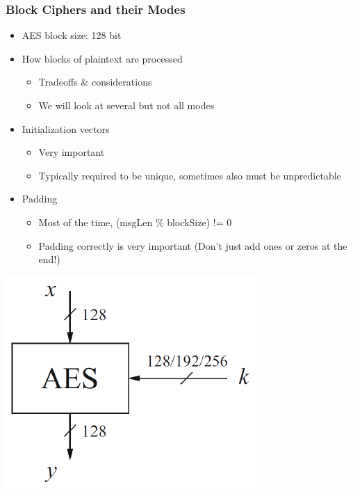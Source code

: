 \subsubsection{Block Ciphers and their Modes}
\begin{minipage}{0.7\linewidth}
  \begin{itemize}
    \item AES block size: 128 bit
    \item How blocks of plaintext are processed
          \begin{itemize}
            \item Tradeoffs \& considerations
            \item We will look at several but not all modes
          \end{itemize}
    \item Initialization vectors
          \begin{itemize}
            \item Very important
            \item Typically required to be unique, sometimes also must be unpredictable
          \end{itemize}
    \item Padding
          \begin{itemize}
            \item Most of the time, (msgLen \% blockSize) != 0
            \item Padding correctly is very important (Don't just add ones or zeros at the end!)
          \end{itemize}
  \end{itemize}
\end{minipage}
\begin{minipage}{0.3\linewidth}
  \includegraphics[width=\linewidth]{images/EmbeddedSecurity/aes}
\end{minipage}

